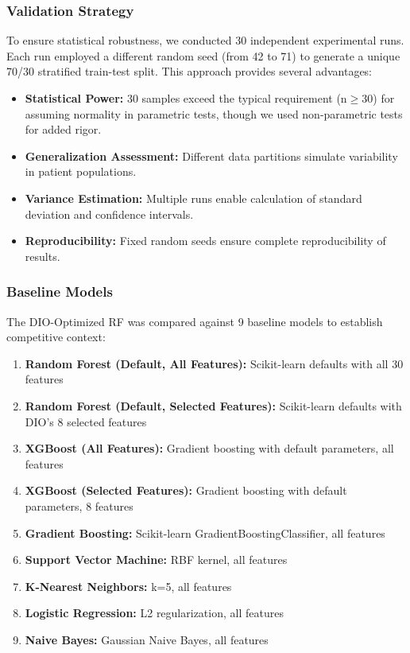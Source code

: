 \documentclass[12pt, a4paper]{article}
\begin{document}
\subsubsection{Validation Strategy}
To ensure statistical robustness, we conducted 30 independent experimental runs. Each run employed a different random seed (from 42 to 71) to generate a unique 70/30 stratified train-test split. This approach provides several advantages:
\begin{itemize}
    \item \textbf{Statistical Power:} 30 samples exceed the typical requirement (n$\geq$30) for assuming normality in parametric tests, though we used non-parametric tests for added rigor.
    \item \textbf{Generalization Assessment:} Different data partitions simulate variability in patient populations.
    \item \textbf{Variance Estimation:} Multiple runs enable calculation of standard deviation and confidence intervals.
    \item \textbf{Reproducibility:} Fixed random seeds ensure complete reproducibility of results.
\end{itemize}

\subsubsection{Baseline Models}
The DIO-Optimized RF was compared against 9 baseline models to establish competitive context:
\begin{enumerate}
    \item \textbf{Random Forest (Default, All Features):} Scikit-learn defaults with all 30 features
    \item \textbf{Random Forest (Default, Selected Features):} Scikit-learn defaults with DIO's 8 selected features
    \item \textbf{XGBoost (All Features):} Gradient boosting with default parameters, all features
    \item \textbf{XGBoost (Selected Features):} Gradient boosting with default parameters, 8 features
    \item \textbf{Gradient Boosting:} Scikit-learn GradientBoostingClassifier, all features
    \item \textbf{Support Vector Machine:} RBF kernel, all features
    \item \textbf{K-Nearest Neighbors:} k=5, all features
    \item \textbf{Logistic Regression:} L2 regularization, all features
    \item \textbf{Naive Bayes:} Gaussian Naive Bayes, all features
\end{enumerate}
\end{document}
